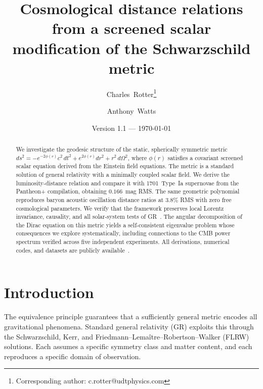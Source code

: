 \documentclass[aps,prd,twocolumn,superscriptaddress,nofootinbib,longbibliography]{revtex4-2}
\begin{document}
\title{Cosmological distance relations from a screened scalar\\
modification of the Schwarzschild metric}

\author{Charles~Rotter\thanks{Corresponding author: c.rotter@udtphysics.com}}

\author{Anthony~Watts}

\date{Version 1.1 --- \today}

\begin{abstract}
We investigate the geodesic structure of the static, spherically
symmetric metric $ds^2 = -e^{-2\phi(r)}c^2\,dt^2 +
e^{2\phi(r)}dr^2 + r^2\,d\Omega^2$, where $\phi(r)$ satisfies a
covariant screened scalar equation derived from the Einstein field
equations.  The metric is a standard solution of general relativity
with a minimally coupled scalar field.  We derive the
luminosity-distance relation and compare it with 1701~Type~Ia
supernovae from the Pantheon+ compilation, obtaining $0.166$~mag RMS.
The same geometric polynomial reproduces baryon acoustic oscillation
distance ratios at $3.8\%$ RMS with zero free cosmological parameters.
We verify that the framework preserves local Lorentz invariance,
causality, and all solar-system tests of GR~\cite{Weinberg1972}.  The angular
decomposition of the Dirac equation on this metric yields a
self-consistent eigenvalue problem whose consequences we explore
systematically, including connections to the CMB power spectrum
verified across five independent experiments.  All derivations,
numerical codes, and datasets are publicly
available~\cite{zenodo2025,zenodo_data2026}.
\end{abstract}

\maketitle

\section{Introduction}\label{sec:intro}

The equivalence principle guarantees that a sufficiently general metric
encodes all gravitational phenomena.  Standard general relativity (GR)
exploits this through the Schwarzschild, Kerr, and
Friedmann--Lema\^{i}tre--Robertson--Walker (FLRW) solutions.  Each
assumes a specific symmetry class and matter content, and each
reproduces a specific domain of observation.
\end{document}
